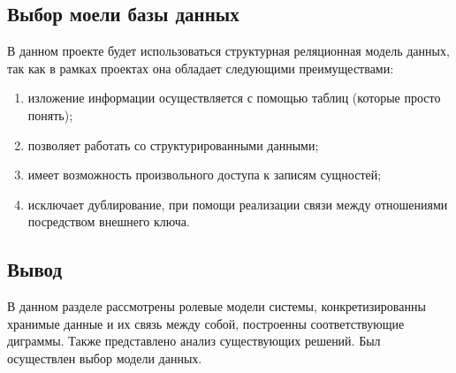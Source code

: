 \subsection{Выбор моели базы данных}

В данном проекте будет использоваться структурная реляционная модель данных, так как в рамках проектах
она обладает следующими преимуществами:


\begin{enumerate}[label=\arabic*.]
	\item изложение информации осуществляется с помощью таблиц (которые просто понять);
	\item позволяет работать со структурированными данными;
	\item имеет возможность произвольного доступа к записям сущностей;
	\item исключает дублирование, при помощи реализации связи между отношениями посредством внешнего ключа.
\end{enumerate}

\subsection*{Вывод}

В данном разделе рассмотрены ролевые модели системы, конкретизированны хранимые данные и их
связь между собой, построенны соответствующие диграммы. Также представлено анализ существующих решений.
Был осуществлен выбор модели данных.